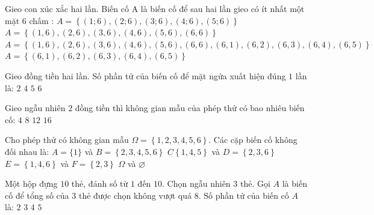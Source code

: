 \begin{ex}
Gieo con xúc xắc hai lần. Biến cố A là biến cố để sau hai lần gieo có ít nhất một mặt 6 chấm :
\choice
{$A=\left\{ (1;6),(2;6),(3;6),(4;6),(5;6) \right\}$}
{$A=\left\{ \left(1{,}6\right),\left(2{,}6\right),\left(3{,}6\right),\left(4{,}6\right),\left(5{,}6\right),\left(6{,}6\right) \right\}$}
{\True $A=\left\{ \left(1{,}6\right),\left(2{,}6\right),\left(3{,}6\right),\left(4{,}6\right),\left(5{,}6\right),\left(6{,}6\right),\left(6{,}1\right),\left(6{,}2\right),\left(6{,}3\right),\left(6{,}4\right),\left(6{,}5\right) \right\}$}
{$A=\left\{ \left(6{,}1\right),\left(6{,}2\right),\left(6{,}3\right),\left(6{,}4\right),\left(6{,}5\right) \right\}$}
\end{ex}
\begin{ex}
Gieo đồng tiền hai lần. Số phần tử của biến cố để mặt ngửa xuất hiện đúng $1$ lần là:
\choice
{\True $2$}
{$4$}
{$5$}
{$6$}
\end{ex}
\begin{ex}
Gieo ngẫu nhiên $2$ đồng tiền thì không gian mẫu của phép thử có bao nhiêu biến cố:
\choice
{\True $4$}
{$8$}
{$12$}
{$16$}
\end{ex}
\begin{ex}
Cho phép thử có không gian mẫu $\Omega =\left\{ 1{,}2,3{,}4,5{,}6 \right\}$. Các cặp biến cố không đối nhau là:
\choice
{$A=\{1\}$ và $B=\left\{ 2{,}3,4{,}5,6 \right\}$}
{$C\left\{ 1{,}4,5 \right\}$ và $D=\left\{ 2{,}3,6 \right\}$}
{\True $E=\left\{ 1{,}4,6 \right\}$ và $F=\left\{ 2{,}3 \right\}$}
{$\Omega $ và $\varnothing $}
\end{ex}
\begin{ex}
Một hộp đựng $10$ thẻ, đánh số từ $1$ đến $10$. Chọn ngẫu nhiên $3$ thẻ. Gọi $A$ là biến cố để tổng số của $3$ thẻ được chọn không vượt quá $8$. Số phần tử của biến cố $A$ là:
\choice
{$2$}
{$3$}
{\True $4$}
{$5$}
\end{ex}
